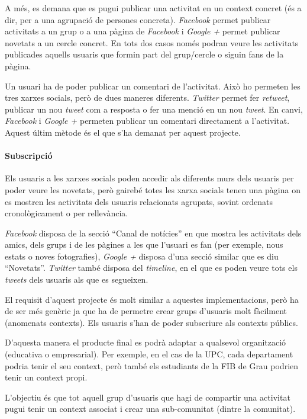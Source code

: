 A més, es demana que es pugui publicar una activitat en un context concret (és a dir, per a una agrupació de persones concreta). \textit{Facebook} permet publicar activitats a un grup o a una pàgina de \textit{Facebook} i \textit{Google +} permet publicar novetats a un cercle concret. En tots dos casos només podran veure les activitats publicades aquells usuaris que formin part del grup/cercle o siguin fans de la pàgina.

Un usuari ha de poder publicar un comentari de l'activitat. Això ho permeten les tres xarxes socials, però de dues maneres diferents. \textit{Twitter} permet fer \textit{retweet}, publicar un nou \textit{tweet} com a resposta o fer una menció en un nou \textit{tweet}. 
En canvi, \textit{Facebook} i \textit{Google +} permeten publicar un comentari directament a l'activitat. Aquest últim mètode és el que s'ha demanat per aquest projecte.

\paragraph{Subscripció\\}

Els usuaris a les xarxes socials poden accedir als diferents murs dels usuaris per poder veure les novetats, però gairebé totes les xarxa socials tenen una pàgina on es mostren les activitats dels usuaris relacionats agrupats, sovint ordenats cronològicament o per rellevància.

\textit{Facebook} disposa de la secció ``Canal de notícies'' en que mostra les activitats dels amics, dels grups i de les pàgines a les que l'usuari es fan (per exemple, nous estats o noves fotografies), \textit{Google +} disposa d'una secció similar que es diu ``Novetats''. \textit{Twitter} també disposa del \textit{timeline}, en el que es poden veure tots els \textit{tweets} dels usuaris als que es segueixen.

El requisit d'aquest projecte és molt similar a aquestes implementacions, però ha de ser més genèric ja que ha de permetre crear grups d'usuaris molt fàcilment (anomenats contexts). Els usuaris s'han de poder subscriure als contexts públics.

D'aquesta manera el producte final es podrà adaptar a qualsevol organització (educativa o empresarial). Per exemple, en el cas de la UPC, cada departament podria tenir el seu context, però també els estudiants de la FIB de Grau podrien tenir un context propi.

L'objectiu és que tot aquell grup d'usuaris que hagi de compartir una activitat pugui tenir un context associat i crear una sub-comunitat (dintre la comunitat).

